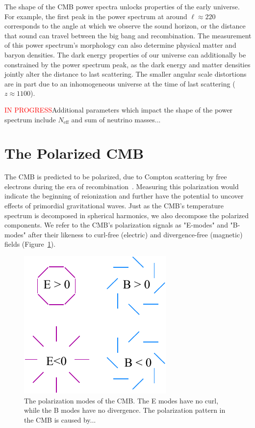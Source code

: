 The shape of the CMB power spectra unlocks properties of the early universe.  For example, the first peak in the power spectrum at around $\ell\approx220$ corresponds to the angle at which we observe the sound horizon, or the distance that sound can travel between the big bang and recombination.  The measurement of this power spectrum's morphology can also determine physical matter and baryon densities.  The dark energy properties of our universe can additionally be constrained by the power spectrum peak, as the dark energy and matter densities jointly alter the distance to last scattering.  The smaller angular scale distortions are in part due to an inhomogeneous universe at the time of last scattering ($z\approx 1100$).  

\textcolor{red}{IN PROGRESS}Additional parameters which impact the shape of the power spectrum include $N_{\text{eff}}$ and sum of neutrino masses...

\section{The Polarized CMB}

The CMB is predicted to be polarized, due to Compton scattering by free electrons during the era of recombination~\cite{weinberg_cosmo}.  Measuring this polarization would indicate the beginning of reionization and further have the potential to uncover effects of primordial gravitational waves.  Just as the CMB's temperature spectrum is decomposed in spherical harmonics, we also decompose the polarized components.  We refer to the CMB's polarization signals as "E-modes" and "B-modes" after their likeness to curl-free (electric) and divergence-free (magnetic) fields (Figure~\ref{fig:e_b_pol}).
\begin{figure}
    \centering
    \includegraphics[width = .45\textwidth]{Figures/EB_pol.pdf}
    \caption{The polarization modes of the CMB.  The E modes have no curl, while the B modes have no divergence.  The polarization pattern in the CMB is caused by...}
    \label{fig:e_b_pol}
\end{figure}

